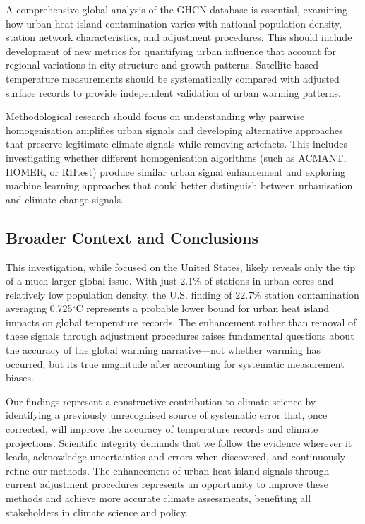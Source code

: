 \documentclass[11pt, a4paper]{article}
\begin{document}
A comprehensive global analysis of the GHCN database is essential, examining how urban heat island contamination varies with national population density, station network characteristics, and adjustment procedures. This should include development of new metrics for quantifying urban influence that account for regional variations in city structure and growth patterns. Satellite-based temperature measurements should be systematically compared with adjusted surface records to provide independent validation of urban warming patterns.

Methodological research should focus on understanding why pairwise homogenisation amplifies urban signals and developing alternative approaches that preserve legitimate climate signals while removing artefacts. This includes investigating whether different homogenisation algorithms (such as ACMANT, HOMER, or RHtest) produce similar urban signal enhancement and exploring machine learning approaches that could better distinguish between urbanisation and climate change signals.

\subsection{Broader Context and Conclusions}

This investigation, while focused on the United States, likely reveals only the tip of a much larger global issue. With just 2.1\% of stations in urban cores and relatively low population density, the U.S. finding of 22.7\% station contamination averaging 0.725$^\circ$C represents a probable lower bound for urban heat island impacts on global temperature records. The enhancement rather than removal of these signals through adjustment procedures raises fundamental questions about the accuracy of the global warming narrative—not whether warming has occurred, but its true magnitude after accounting for systematic measurement biases.

Our findings represent a constructive contribution to climate science by identifying a previously unrecognised source of systematic error that, once corrected, will improve the accuracy of temperature records and climate projections. Scientific integrity demands that we follow the evidence wherever it leads, acknowledge uncertainties and errors when discovered, and continuously refine our methods. The enhancement of urban heat island signals through current adjustment procedures represents an opportunity to improve these methods and achieve more accurate climate assessments, benefiting all stakeholders in climate science and policy.
\end{document}
